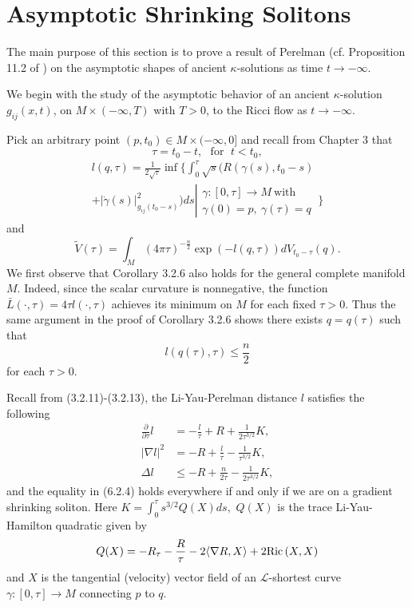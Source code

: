 \section{Asymptotic Shrinking Solitons}
The main purpose of this section is to prove a result of Perelman
(cf. Proposition 11.2 of \cite{P1}) on the asymptotic shapes of
ancient $\kappa$-solutions as time $t \rightarrow -\infty$.


We begin with the study of the asymptotic behavior of an ancient
$\kappa$-solution $g_{ij}(x,t)$, on $M\times (-\infty,T)$ with
$T>0$, to the Ricci flow as $t\rightarrow-\infty$.

Pick an arbitrary point $(p,t_0)\in M\times(-\infty,0]$ and recall
from Chapter 3 that
$$
\tau=t_0-t,\ \ \ \mbox{for }\; t<t_0,
$$
\begin{multline*}
l(q,\tau)=\frac{1}{2\sqrt{\tau}}\inf \bigg\{
\int_0^\tau\sqrt{s}\Big(R(\gamma(s),t_0-s) \\
+|\dot{\gamma}(s)|^2_{g_{ij}(t_0-s)}\Big)ds \left|
\begin{array}{c}
\gamma:[0,\tau]\rightarrow M\ \mbox{with}\\[1mm]
\gamma(0)=p,\ \gamma(\tau)=q\
\end{array}\bigg\}\right.
\end{multline*}
and
$$
\tilde{V}(\tau)=\int_M(4\pi\tau)^{-\frac{n}{2}}
\exp(-l(q,\tau))dV_{t_0-\tau}(q).
$$
We first observe that Corollary 3.2.6 also holds for the general
complete manifold $M$. Indeed, since the scalar curvature is
nonnegative, the function $\bar{L}(\cdot,\tau)=4\tau
l(\cdot,\tau)$ achieves its minimum on $M$ for each fixed
$\tau>0$. Thus the same argument in the proof of Corollary 3.2.6
shows there exists $q=q(\tau)$ such that \begin{equation}
l(q(\tau),\tau)\leq\frac{n}{2} %
\end{equation} for each $\tau>0$.

Recall from (3.2.11)-(3.2.13), the Li-Yau-Perelman distance $l$
satisfies the following
\begin{align}
\frac{\partial}{\partial\tau}l
&=-\frac{l}{\tau}+R+\frac{1}{2\tau^{3/2}}K, \\  %
|\nabla l|^2&=-R+\frac{l}{\tau}-\frac{1}{\tau^{3/2}}K, \\  %
\Delta l& \leq-R+\frac{n}{2\tau}-\frac{1}{2\tau^{3/2}}K,  %
\end{align}
and the equality in (6.2.4) holds everywhere if and only if we are
on a gradient shrinking soliton. Here $K=\int_0^\tau
s^{3/2}Q(X)ds,$ $Q(X)$ is the trace Li-Yau-Hamilton quadratic
given by
$$
Q(X)=-R_{\tau} -\frac{R}{\tau}-2 \langle\nabla
R,X\rangle+2{\rm Ric}\,(X,X)
$$
and $X$ is the tangential (velocity) vector field of an
$\mathcal{L}$-shortest curve $\gamma: [0,\tau]\rightarrow M$
connecting $p$ to $q$.

